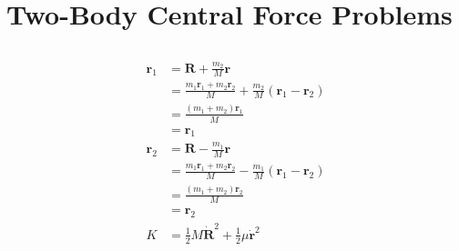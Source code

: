 \documentclass{article}
\renewcommand{\vec}[1]{\boldsymbol{\mathbf{#1}}}
\newcommand{\dvec}[1]{\dot{\vec{#1}}}
\begin{document}
\section{Two-Body Central Force Problems}

\subsection{}

\begin{align*}
  \vec{r}_1 & = \vec{R} + \frac{m_2}{M} \vec{r}                                                                                                                                                       \\
            & = \frac{m_1 \vec{r}_1 + m_2 \vec{r}_2}{M} + \frac{m_2}{M} (\vec{r}_1 - \vec{r}_2)                                                                                                       \\
            & = \frac{(m_1 + m_2) \vec{r}_1}{M}                                                                                                                                                       \\
            & = \vec{r}_1                                                                                                                                                                             \\
  \vec{r}_2 & = \vec{R} - \frac{m_1}{M} \vec{r}                                                                                                                                                       \\
            & = \frac{m_1 \vec{r}_1 + m_2 \vec{r}_2}{M} - \frac{m_1}{M} (\vec{r}_1 - \vec{r}_2)                                                                                                       \\
            & = \frac{(m_1 + m_2) \vec{r}_2}{M}                                                                                                                                                       \\
            & = \vec{r}_2                                                                                                                                                                             \\
  K         & = \frac{1}{2} M \dvec{R}^2 + \frac{1}{2} \mu \dvec{r}^2                                                                                                                                 \\

\end{align*}
\end{document}
